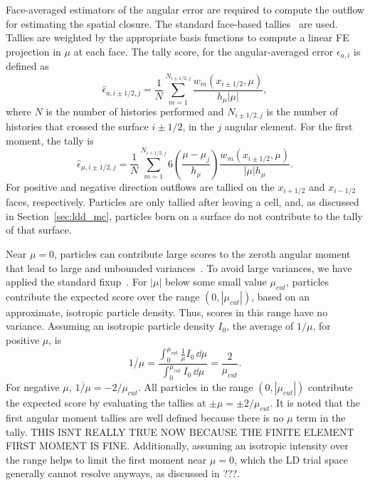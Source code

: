 Face-averaged estimators of the angular error are required to compute the outflow for
estimating the spatial closure. The standard face-based
tallies~\cite{shultis_mc,favorite_faces} are used.  Tallies are weighted by
the appropriate basis functions to compute a linear FE projection in $\mu$ at each face.  The
tally score, for the angular-averaged error $\epsilon_{a,i}$ is defined as
\begin{equation}
    \hat \epsilon_{a,i\pm1/2,j} = \frac{1}{N} \sum_{m=1}^{N_{i\pm1/2,j}}
    \frac{w_m(x_{i\pm1/2},\mu)}{h_{\mu} |\mu|},
\end{equation}
where $N$ is the number of histories performed and $N_{i\pm1/2,j}$ is the number of histories
that crossed the surface $i\pm1/2$, in the $j$ angular element.   For the first
moment, the tally is
\begin{equation}\label{eq:face_mutally}
    \hat \epsilon_{\mu,i\pm1/2,j} = \frac{1}{N} \sum_{m=1}^{N_{i+1/2,j}} 
    6\left(\frac{\mu-\mu_j}{h_\mu}\right) \frac{w_m(x_{i\pm1/2},\mu)}{|\mu| h_{\mu}}.
\end{equation}
For positive and negative direction outflows are tallied
on the $x_{i+1/2}$ and $x_{i-1/2}$ faces, respectively. Particles are only tallied after leaving
a cell, and, as discussed in Section~\ref{sec:ldd_mc}, particles born on a surface do not contribute
to the tally of that surface.

Near $\mu=0$, particles can contribute large scores to the zeroth angular moment that lead to large and
unbounded variances~\cite{favorite_faces}.  To avoid large variances, we have applied the standard fixup~\cite{mcnp,favorite_faces}.  
For $|\mu|$ below some small value $\mu_{cut}$, 
particles contribute the expected score over the range $(0,|\mu_{cut}|)$, based on an
approximate, isotropic particle density. Thus, scores in this range have no variance.  Assuming
an isotropic particle density $I_0$, the average of
$1/\mu$, for positive $\mu$, is
\begin{equation}
    \overline{1/\mu} = \frac{\displaystyle \int_0^{\mu_{cut}}\frac{1}{\mu} I_0 \,\dd
\mu}{\displaystyle \int_0^{\mu_{cut}} I_0\, \dd \mu} =
    \frac{2}{\mu_{cut}}.
\end{equation}
For negative $\mu$, $\overline{1/\mu}=-2/\mu_{cut}$.
All particles in the range $(0,|\mu_{cut}|)$ contribute the expected score by evaluating
the tallies at $\pm\mu = \pm2/\mu_{cut}$.  It is noted that the first angular moment tallies are
well defined because there is no $\mu$ term in the tally. THIS ISNT REALLY TRUE NOW
BECAUSE THE FINITE ELEMENT FIRST MOMENT IS FINE. Additionally, assuming an isotropic intensity over the range helps to limit
the first moment near $\mu=0$, which the LD trial space
generally cannot resolve anyways, as discussed in ???.

